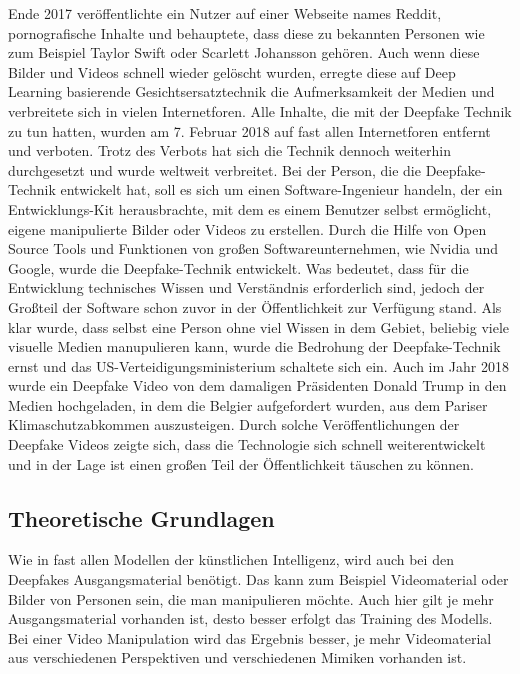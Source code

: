 Ende 2017 veröffentlichte ein Nutzer auf einer Webseite names Reddit, pornografische Inhalte und behauptete, dass diese zu bekannten Personen wie zum Beispiel Taylor Swift oder Scarlett Johansson gehören.
Auch wenn diese Bilder und Videos schnell wieder gelöscht wurden, erregte diese auf Deep Learning basierende Gesichtsersatztechnik die Aufmerksamkeit der Medien und verbreitete sich in vielen Internetforen.
Alle Inhalte, die mit der Deepfake Technik zu tun hatten, wurden am 7. Februar 2018 auf fast allen Internetforen entfernt und verboten.
Trotz des Verbots hat sich die Technik dennoch weiterhin durchgesetzt und wurde weltweit verbreitet.
Bei der Person, die die Deepfake-Technik entwickelt hat, soll es sich um einen Software-Ingenieur handeln, der ein Entwicklungs-Kit herausbrachte, mit dem es einem Benutzer selbst ermöglicht, eigene manipulierte Bilder oder Videos zu erstellen.
Durch die Hilfe von Open Source Tools und Funktionen von großen Softwareunternehmen, wie Nvidia und Google, wurde die Deepfake-Technik entwickelt. Was bedeutet, dass für die Entwicklung technisches Wissen und Verständnis erforderlich sind, jedoch der Großteil der Software schon zuvor in der Öffentlichkeit zur Verfügung stand.
Als klar wurde, dass selbst eine Person ohne viel Wissen in dem Gebiet, beliebig viele visuelle Medien manupulieren kann, wurde die Bedrohung der Deepfake-Technik ernst und das US-Verteidigungsministerium schaltete sich ein.
Auch im Jahr 2018 wurde ein Deepfake Video von dem damaligen Präsidenten Donald Trump in den Medien hochgeladen, in dem die Belgier aufgefordert wurden, aus dem Pariser Klimaschutzabkommen auszusteigen.\newline
Durch solche Veröffentlichungen der Deepfake Videos zeigte sich, dass die Technologie sich schnell weiterentwickelt und in der Lage ist einen großen Teil der Öffentlichkeit täuschen zu können.\cite{Jatit}

\subsection{Theoretische Grundlagen}
Wie in fast allen Modellen der künstlichen Intelligenz, wird auch bei den Deepfakes Ausgangsmaterial benötigt. Das kann zum Beispiel Videomaterial oder Bilder von Personen sein, die man manipulieren möchte. Auch hier gilt je mehr Ausgangsmaterial vorhanden ist, desto besser erfolgt das Training des Modells. Bei einer Video Manipulation wird das Ergebnis besser, je mehr Videomaterial aus verschiedenen Perspektiven und verschiedenen Mimiken vorhanden ist.\cite{HochschuleDerMedien}\newline
